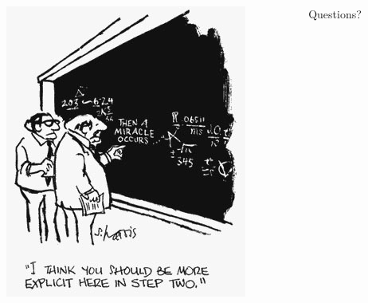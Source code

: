 \documentclass{beamer}\usepackage[]{graphicx}\usepackage[]{color}
\begin{document}
\begin{frame}
\begin{columns}
\begin{column}{.6\textwidth}
\includegraphics[scale=.5]{./Figures/Cartoon}
\end{column}

\begin{column}{.4\textwidth}
\huge{Questions?}
\end{column}
\end{columns}

\end{frame}
\end{document}
